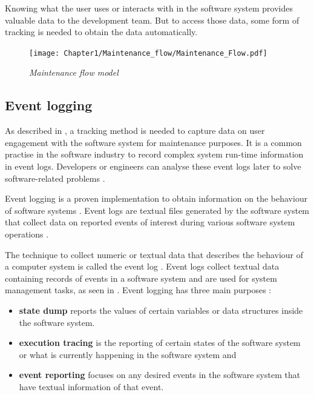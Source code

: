 \clearpage

Knowing what the user uses or interacts with in the software system provides valuable data to the development team. But to access those data, some form of tracking is needed to obtain the data automatically.

\begin{figure}[!htb]
	\centering %
	\texttt{[image: Chapter1/Maintenance\_flow/Maintenance\_Flow.pdf]}
	\caption[Maintenance flow model]
	{\textit{Maintenance flow model \cite{Tang2010}}} \label{fig:ch1_maintenanceFlow}
\end{figure}

\clearpage

\subsection{Event logging}\label{sec:ch1_eventLogging}
As described in , a tracking method is needed to capture data on user engagement with the software system for maintenance purposes. It is a common practise in the software industry to record complex system run-time information in event logs. Developers or engineers can analyse these event logs later to solve software-related problems \cite{Zhu2019}. \par Event logging is a proven implementation to obtain information on the behaviour of software systems \cite{Baccanico2014}. Event logs are textual files generated by the software system that collect data on reported events of interest during various software system operations \cite{Cinque2013, Baccanico2014}.

\par The technique to collect numeric or textual data that describes the behaviour of a computer system is called the event log \cite{Pecchia2015, Baccanico2014}. Event logs collect textual data containing records of events in a software system and are used for system management tasks, as seen in  \cite{Rong2018a, Rong2018, Baccanico2014}. Event logging has three main purposes \cite{Pecchia2015, Baccanico2014}:

\begin{itemize}
	\item \textbf{state dump} reports the values of certain variables or data structures inside the software system.
	\item \textbf{execution tracing} is the reporting of certain states of the software system or what is currently happening in the software system and
	\item \textbf{event reporting} focuses on any desired events in the software system that have textual information of that event.
\end{itemize}


